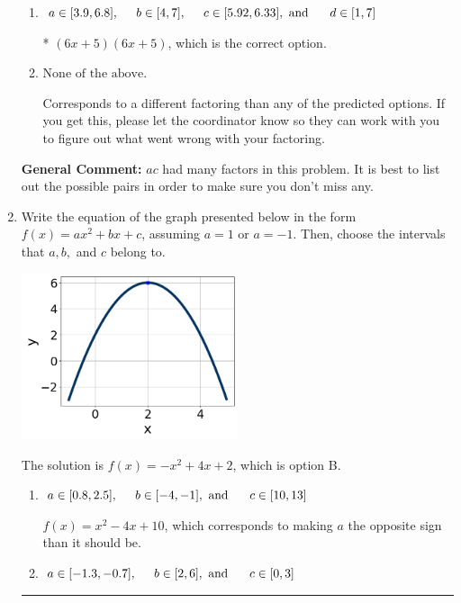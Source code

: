 \documentclass{extbook}[14pt]
\newcommand{\litem}[1]{\item #1

\rule{\textwidth}{0.4pt}}
\begin{document}
\begin{enumerate}
{\begin{enumerate}[label=\Alph*.]
 $(x + 30)(x + 30)$, which corresponds to factoring $x^{2} +60 x + 900$.
\item \( a \in [3.9, 6.8], \hspace*{5mm} b \in [4, 7], \hspace*{5mm} c \in [5.92, 6.33], \text{ and } \hspace*{5mm} d \in [1, 7] \)

* $(6x + 5)(6x + 5)$, which is the correct option.
\item \( \text{None of the above.} \)

 Corresponds to a different factoring than any of the predicted options. If you get this, please let the coordinator know so they can work with you to figure out what went wrong with your factoring.
\end{enumerate}

\textbf{General Comment:} $ac$ had many factors in this problem. It is best to list out the possible pairs in order to make sure you don't miss any.
}
\litem{
Write the equation of the graph presented below in the form $f(x)=ax^2+bx+c$, assuming  $a=1$ or $a=-1$. Then, choose the intervals that $a, b,$ and $c$ belong to.

\begin{center}
    \includegraphics[width=0.5\textwidth]{../Figures/quadraticGraphToEquationCopyC.png}
\end{center}


The solution is \( f(x) = -x^{2} +4 x + 2 \), which is option B.\begin{enumerate}[label=\Alph*.]
\item \( a \in [0.8, 2.5], \hspace*{5mm} b \in [-4, -1], \text{ and } \hspace*{5mm} c \in [10, 13] \)

$f(x)=x^{2} -4 x + 10$, which corresponds to making $a$ the opposite sign than it should be.
\item \( a \in [-1.3, -0.7], \hspace*{5mm} b \in [2, 6], \text{ and } \hspace*{5mm} c \in [0, 3] \)


\end{enumerate}}
\end{enumerate}
\end{document}
